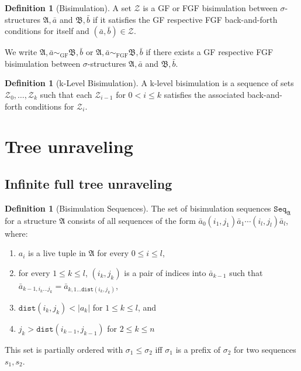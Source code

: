 \documentclass[draft]{scrartcl}
\theoremstyle{definition}
\newtheorem{definition}[theorem]{Definition}
\newcommand{\struct}[1]{\mathfrak{#1}}
\newcommand{\seqset}[1]{\mathtt{Seq}_{#1}}
\newcommand{\dist}[2]{\mathtt{dist}({#1},{#2})}
\begin{document}
\begin{definition}[Bisimulation]
A set $\mathcal{Z}$ is a GF or FGF bisimulation between $\sigma$-structures $\mathfrak{A}, \bar{a}$ and $\mathfrak{B}, \bar{b}$ if it satisfies the GF respective FGF back-and-forth conditions for itself and $(\bar{a}, \bar{b}) \in \mathcal{Z}$.
\end{definition}

We write $\mathfrak{A}, \bar{a} \sim_{\textrm{GF}} \mathfrak{B}, \bar{b}$ or $\mathfrak{A}, \bar{a} \sim_{\textrm{FGF}} \mathfrak{B}, \bar{b}$ if there exists a GF respective FGF bisimulation between $\sigma$-structures $\mathfrak{A}, \bar{a}$ and $\mathfrak{B}, \bar{b}$.

\begin{definition}[k-Level Bisimulation]
A k-level bisimulation is a sequence of sets $\mathcal{Z}_0, \ldots, \mathcal{Z}_k$ such that each $\mathcal{Z}_{i - 1}$ for $0 < i \le k$ satisfies the associated back-and-forth conditions for $\mathcal{Z}_i$.
\end{definition}

\pagebreak

\section{Tree unraveling}

\subsection{Infinite full tree unraveling}

\begin{definition}[Bisimulation Sequences]
  The set of bisimulation sequences $\seqset{\struct{A}}$ for a structure $\struct{A}$ consists of all sequences of the form $\bar{a}_{0}(i_{1}, j_{1})\bar{a}_{1}\cdots{}(i_{l},j_{l})\bar{a}_{l}$, where:
  \begin{enumerate}[(1)]
    \item $a_{i}$ is a live tuple in $\struct{A}$ for every $0 \le i \le l$,
    \item for every $1 \le k \le l$, $(i_{k}, j_{k})$ is a pair of indices into $\bar{a}_{k-1}$ such that $\bar{a}_{k-1,i_{k}\ldots{}j_{k}} = \bar{a}_{k,1\ldots{\dist{i_{k}}{j_{k}}}}$,
    \item $\dist{i_{k}}{j_{k}} < |a_{k}|$ for $1 \le k \le l$, and
    \item $j_{k} > \dist{i_{k-1}}{j_{k-1}}$ for $2 \le k \le n$
  \end{enumerate}
  This set is partially ordered with $\sigma_{1} \le \sigma_{2}$ iff $\sigma_{1}$ is a prefix of $\sigma_{2}$ for two sequences $s_{1}, s_{2}$.
\end{definition}
\end{document}
